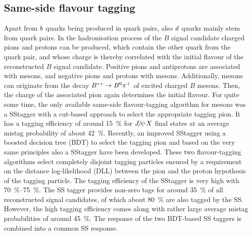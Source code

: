 
\subsection{Same-side flavour tagging}
\label{sec:detecor:tagging:sstagger}

Apart from ${b}$ quarks being produced in \bbbar quark pairs, also
${d}$ quarks mainly stem from \ddbar quark pairs. In the hadronisation
process of the $B$ signal candidate charged pions and protons can be produced,
which contain the other quark from the \ddbar quark pair, and whose charge is
thereby correlated with the initial flavour of the reconstructed $B$ signal
candidate. Positive pions and antiprotons are associated with \Bz mesons, and
negative pions and protons with \Bzb mesons. Additionally, \Bd mesons can
originate from the decay $B^{*+}\!\rightarrow{\ensuremath{{B}^0}}{\ensuremath{{\pi}^+}}$ of excited charged $B$ mesons.
Then, the charge of the associated pion again determines the initial flavour.
For quite some time, the only available same-side flavour-tagging algorithm for
\Bz mesons was a SS\pion tagger with a cut-based approach to select the
appropriate tagging pion. It has a tagging efficiency of around
\SI{15}{\percent} for ${{J\mskip -3mu/\mskip -2mu\psi\mskip 2mu}}X$ final states at an average mistag probability
of about \SI{42}{\percent}. Recently, an improved SS\pion tagger using a
boosted decision tree (BDT) to select the tagging pion and based on the very
same principles also a SS\proton tagger have been
developed\cite{CERN-THESIS-2015-040,LHCb-PAPER-2016-039}. These two
flavour-tagging algorithms select completely disjoint tagging particles
ensured by a requirement on the distance log-likelihood (DLL) between the pion
and the proton hypothesis of the tagging particle. The tagging efficiency of
the SS\pion tagger is very high with \SIrange{70}{75}{\percent}. The SS\proton
tagger provides non-zero tags for around \SI{35}{\percent} of all
reconstructed signal candidates, of which about \SI{80}{\percent} are also
tagged by the SS\pion. However, the high tagging efficiency comes along
with rather large average mistag probabilities of around \SI{45}{\percent}.
The response of the two BDT-based SS taggers is combined into a common SS
response.